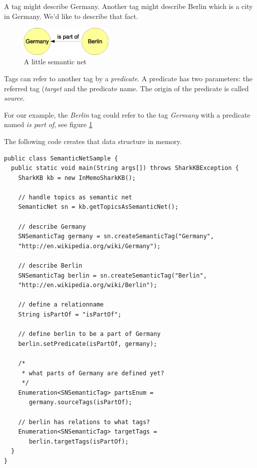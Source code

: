 A tag might describe Germany. Another tag might describe Berlin which is a city in Germany. We'd like to describe that fact.

\begin{figure}[t]
\centering
\includegraphics[width=0.40\textwidth]{semanticNet.eps}
\caption{A little semantic net}
\label{fig:semanticNet}
\end{figure}

Tags can refer to another tag by a {\it predicate}. A predicate has two parameters: the referred tag ({\it target} and the predicate name. The origin of the predicate is called {\it source}. 

For our example, the {\it Berlin} tag could refer to the tag {\it Germany} with a predicate named {\it is part of}, see figure \ref{fig:semanticNet}

The following code creates that data structure in memory.

\begin{verbatim}
public class SemanticNetSample {
  public static void main(String args[]) throws SharkKBException {
    SharkKB kb = new InMemoSharkKB();
        
    // handle topics as semantic net
    SemanticNet sn = kb.getTopicsAsSemanticNet();
        
    // describe Germany
    SNSemanticTag germany = sn.createSemanticTag("Germany", 
    "http://en.wikipedia.org/wiki/Germany");
        
    // describe Berlin
    SNSemanticTag berlin = sn.createSemanticTag("Berlin", 
    "http://en.wikipedia.org/wiki/Berlin");
        
    // define a relationname
    String isPartOf = "isPartOf";

    // define berlin to be a part of Germany
    berlin.setPredicate(isPartOf, germany);
        
    /* 
     * what parts of Germany are defined yet?
     */ 
    Enumeration<SNSemanticTag> partsEnum = 
       germany.sourceTags(isPartOf);
        
    // berlin has relations to what tags?
    Enumeration<SNSemanticTag> targetTags = 
       berlin.targetTags(isPartOf);
  }       
}

\end{verbatim}

